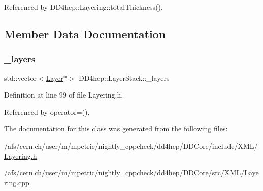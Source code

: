 Referenced by D\+D4hep\+::\+Layering\+::total\+Thickness().



\subsection{Member Data Documentation}
\hypertarget{class_d_d4hep_1_1_layer_stack_a0e07d58da724e44b4d1c77120fb448d0}{}\label{class_d_d4hep_1_1_layer_stack_a0e07d58da724e44b4d1c77120fb448d0} 
\subsubsection{\texorpdfstring{\+\_\+layers}{\_layers}}
{\footnotesize\ttfamily std\+::vector$<$\hyperlink{class_d_d4hep_1_1_layer}{Layer}$\ast$$>$ D\+D4hep\+::\+Layer\+Stack\+::\+\_\+layers}



Definition at line 99 of file Layering.\+h.



Referenced by operator=().



The documentation for this class was generated from the following files\+:\begin{DoxyCompactItemize}
\item 
/afs/cern.\+ch/user/m/mpetric/nightly\+\_\+cppcheck/dd4hep/\+D\+D\+Core/include/\+X\+M\+L/\hyperlink{_layering_8h}{Layering.\+h}\item 
/afs/cern.\+ch/user/m/mpetric/nightly\+\_\+cppcheck/dd4hep/\+D\+D\+Core/src/\+X\+M\+L/\hyperlink{_layering_8cpp}{Layering.\+cpp}\end{DoxyCompactItemize}
